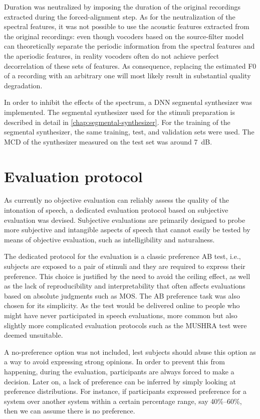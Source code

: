 Duration was neutralized by imposing the duration of the original recordings extracted during the forced-alignment step.
As for the neutralization of the spectral features, it was not possible to use the acoustic features extracted from the original recordings:
even though vocoders based on the source-filter model can theoretically separate the periodic information from the spectral features and the aperiodic features, in reality vocoders often do not achieve perfect decorrelation of these sets of features.
As consequence, replacing the estimated \ac{F0} of a recording with an arbitrary one will most likely result in substantial quality degradation.

In order to inhibit the effects of the spectrum, a \ac{DNN} segmental synthesizer was implemented.
The segmental synthesizer used for the stimuli preparation is described in detail in \autoref{chap:segmental-synthesizer}.
For the training of the segmental synthesizer, the same training, test, and validation sets were used.
The \ac{MCD}
of the synthesizer measured on the test set was around 7~dB.


\section{Evaluation protocol}

As currently no objective evaluation can reliably assess the quality of the intonation of speech, a dedicated evaluation protocol based on subjective evaluation was devised.
Subjective evaluations are primarily designed to probe more subjective and intangible aspects of speech that cannot easily be tested by means of objective evaluation, such as intelligibility and naturalness.

The dedicated protocol for the evaluation is a classic preference AB test, i.e., subjects are exposed to a pair of stimuli and they are required to express their preference.
This choice is justified by the need to avoid the ceiling effect, as well as the lack of reproducibility and interpretability that often affects evaluations based on absolute judgments such as \ac{MOS}.
The AB preference task was also chosen for its simplicity.
As the test would be delivered online to people who might have never participated in speech evaluations, more common but also slightly more complicated evaluation protocols such as the \ac{MUSHRA} test were deemed unsuitable.

A no-preference option was not included, lest subjects should abuse this option as a way to avoid expressing strong opinions.
In order to prevent this from happening, during the evaluation, participants are always forced to make a decision.
Later on, a lack of preference can be inferred by simply looking at preference distributions.
For instance, if participants expressed preference for a system over another system within a certain percentage range, say 40\%--60\%, then we can assume there is no preference.

